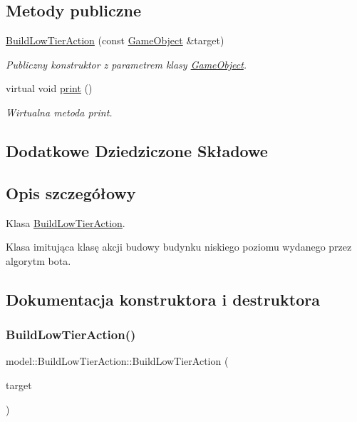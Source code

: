 \subsection*{Metody publiczne}
\begin{DoxyCompactItemize}
\item 
\hyperlink{classmodel_1_1BuildLowTierAction_ad2f9e823c6e3d955590f0326f2ced54d}{Build\+Low\+Tier\+Action} (const \hyperlink{classmodel_1_1GameObject}{Game\+Object} \&target)
\begin{DoxyCompactList}\small\item\em Publiczny konstruktor z parametrem klasy \hyperlink{classmodel_1_1GameObject}{Game\+Object}. \end{DoxyCompactList}\item 
virtual void \hyperlink{classmodel_1_1BuildLowTierAction_a0917c29053656d5914125a30bcd51cce}{print} ()
\begin{DoxyCompactList}\small\item\em Wirtualna metoda print. \end{DoxyCompactList}\end{DoxyCompactItemize}
\subsection*{Dodatkowe Dziedziczone Składowe}


\subsection{Opis szczegółowy}
Klasa \hyperlink{classmodel_1_1BuildLowTierAction}{Build\+Low\+Tier\+Action}. 

Klasa imitująca klasę akcji budowy budynku niskiego poziomu wydanego przez algorytm bota. 

\subsection{Dokumentacja konstruktora i destruktora}
\mbox{\label{classmodel_1_1BuildLowTierAction_ad2f9e823c6e3d955590f0326f2ced54d}} 
\subsubsection{\texorpdfstring{Build\+Low\+Tier\+Action()}{BuildLowTierAction()}}
{\footnotesize\ttfamily model\+::\+Build\+Low\+Tier\+Action\+::\+Build\+Low\+Tier\+Action (\begin{DoxyParamCaption}\item[{const \hyperlink{classmodel_1_1GameObject}{Game\+Object} \&}]{target }\end{DoxyParamCaption})\hspace{0.3cm}{\ttfamily [inline]}}



